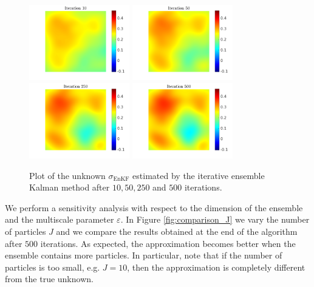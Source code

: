 \documentclass[10pt]{article}
\begin{document}
\begin{figure}[t]
\centering
\includegraphics[width = 0.39\textwidth]{figures/ensemble_10}
\includegraphics[width = 0.39\textwidth]{figures/ensemble_50}
\\
\includegraphics[width = 0.39\textwidth]{figures/ensemble_250}
\includegraphics[width = 0.39\textwidth]{figures/ensemble_500}
\caption{Plot of the unknown $\sigma_{\mathrm{EnKF}}$ estimated by the iterative ensemble Kalman method after $10, 50, 250$ and $500$ iterations.}
\label{fig:best_solution}
\end{figure}

We perform a sensitivity analysis with respect to the dimension of the ensemble and the multiscale parameter $\varepsilon$. In Figure \ref{fig:comparison_J} we vary the number of particles $J$ and we compare the results obtained at the end of the algorithm after $500$ iterations. As expected, the approximation becomes better when the ensemble contains more particles. In particular, note that if the number of particles is too small, e.g. $J = 10$, then the approximation is completely different from the true unknown.
\end{document}
